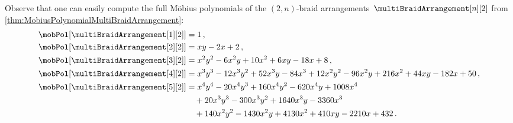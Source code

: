 \documentclass{amsart}
\theoremstyle{definition}
\begin{document}
Observe that one can easily compute the full M\"obius polynomials of the $(2,n)$-braid arrangements~$\multiBraidArrangement[n][2]$ from \cref{thm:MobiusPolynomialMultiBraidArrangement}:
\begin{align*}
\allowdisplaybreaks
\mobPol[{\multiBraidArrangement[1][2]}] & = 1 \, , \\
\mobPol[{\multiBraidArrangement[2][2]}] & = x y - 2 x + 2 \, , \\
\mobPol[{\multiBraidArrangement[3][2]}] & = x^2 y^2 - 6 x^2 y + 10 x^2 + 6 x y - 18 x + 8 \, , \\
\mobPol[{\multiBraidArrangement[4][2]}] & = x^3 y^3 - 12 x^3 y^2 + 52 x^3 y - 84 x^3 + 12 x^2 y^2 - 96 x^2 y + 216 x^2 + 44 x y - 182 x + 50 \, , \\
\mobPol[{\multiBraidArrangement[5][2]}] & = x^4 y^4 - 20 x^4 y^3 + 160 x^4 y^2 - 620 x^4 y + 1008 x^4 \\ & \quad+ 20 x^3 y^3 - 300 x^3 y^2 + 1640 x^3 y - 3360 x^3 \\ & \quad+ 140 x^2 y^2 - 1430 x^2 y + 4130 x^2 + 410 x y - 2210 x + 432 \, .
\end{align*}
\end{document}
